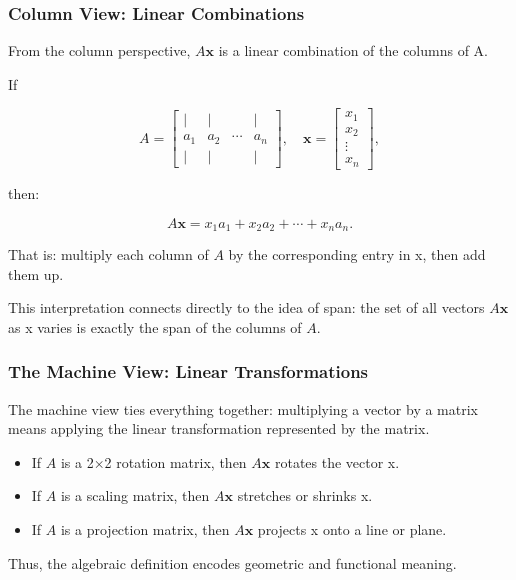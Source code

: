 \documentclass[
  letterpaper,
  DIV=11,
  numbers=noendperiod]{scrreprt}
\providecommand{\tightlist}{%
  \setlength{\itemsep}{0pt}\setlength{\parskip}{0pt}}
\begin{document}
\subsubsection{Column View: Linear
Combinations}\label{column-view-linear-combinations}

From the column perspective, \(A\mathbf{x}\) is a linear combination of
the columns of A.

If

\[
A = 
\begin{bmatrix} 
| & | &  & | \\ 
a_1 & a_2 & \cdots & a_n \\ 
| & | &  & |
\end{bmatrix}, 
\quad
\mathbf{x} =
\begin{bmatrix} 
x_1 \\ x_2 \\ \vdots \\ x_n
\end{bmatrix},
\]

then:

\[
A\mathbf{x} = x_1 a_1 + x_2 a_2 + \cdots + x_n a_n.
\]

That is: multiply each column of \(A\) by the corresponding entry in x,
then add them up.

This interpretation connects directly to the idea of span: the set of
all vectors \(A\mathbf{x}\) as x varies is exactly the span of the
columns of \(A\).

\subsubsection{The Machine View: Linear
Transformations}\label{the-machine-view-linear-transformations}

The machine view ties everything together: multiplying a vector by a
matrix means applying the linear transformation represented by the
matrix.

\begin{itemize}
\tightlist
\item
  If \(A\) is a 2×2 rotation matrix, then \(A\mathbf{x}\) rotates the
  vector x.
\item
  If \(A\) is a scaling matrix, then \(A\mathbf{x}\) stretches or
  shrinks x.
\item
  If \(A\) is a projection matrix, then \(A\mathbf{x}\) projects x onto
  a line or plane.
\end{itemize}

Thus, the algebraic definition encodes geometric and functional meaning.
\end{document}
